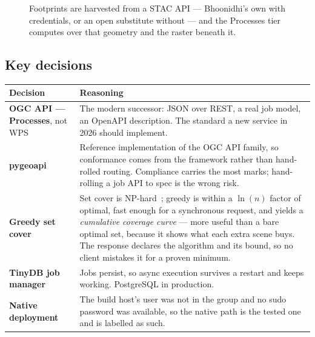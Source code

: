 \begin{figure}[htbp]
{}
\caption{Footprints are harvested from a STAC API --- Bhoonidhi's own with
credentials, or an open substitute without --- and the Processes tier computes
over that geometry and the raster beneath it.}
\label{fig:arch}
\end{figure}

\subsection{Key decisions}

\begin{center}
\small
\begin{tabularx}{\textwidth}{@{}>{\raggedright\arraybackslash}p{}>{\raggedright\arraybackslash}X@{}}
\toprule
\textbf{Decision} & \textbf{Reasoning} \\
\midrule
\textbf{OGC API --- Processes}, not WPS
  & The modern successor: JSON over REST, a real job model, an OpenAPI
    description. The standard a new service in 2026 should implement. \\
\textbf{pygeoapi}
  & Reference implementation of the OGC API family, so conformance comes from
    the framework rather than hand-rolled routing. Compliance carries the most
    marks; hand-rolling a job API to spec is the wrong risk. \\
\textbf{Greedy set cover}
  & Set cover is NP-hard~\cite{setcover}; greedy is within a $\ln(n)$ factor of
    optimal, fast enough for a synchronous request, and yields a
    \emph{cumulative coverage curve} --- more useful than a bare optimal set,
    because it shows what each extra scene buys. The response declares the
    algorithm and its bound, so no client mistakes it for a proven minimum. \\
\textbf{TinyDB job manager}
  & Jobs persist, so async execution survives a restart and \ep{/jobs/\{id\}}
    keeps working. PostgreSQL in production. \\
\textbf{Native deployment}
  & The build host's user was not in the \code{docker} group and no sudo
    password was available, so the native path is the tested one and is
    labelled as such. \\
\bottomrule
\end{tabularx}
\end{center}

